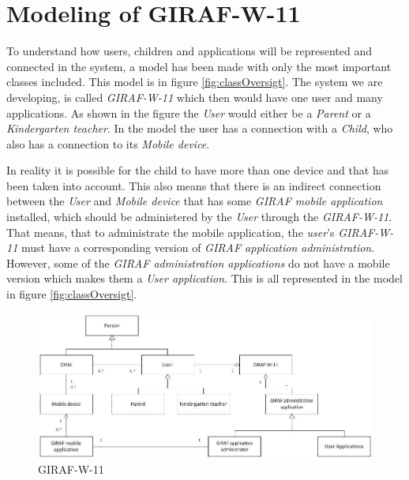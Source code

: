 \section{Modeling of GIRAF-W-11}
To understand how users, children and applications will be represented and connected in the system, a model has been made with only the most important classes included. This model is in figure \vref{fig:classOversigt}. The system we are developing, is called \emph{GIRAF-W-11} which then would have one user and many applications. As shown in the figure the \emph{User} would either be a \emph{Parent} or a \emph{Kindergarten teacher}. In the model the user has a connection with a \emph{Child}, who also has a connection to its \emph{Mobile device}.

In reality it is possible for the child to have more than one device and that has been taken into account. This also means that there is an indirect connection between the \emph{User} and \emph{Mobile device} that has some \emph{GIRAF mobile application} installed, which should be administered by the \emph{User} through the \emph{GIRAF-W-11}. That means, that to administrate the mobile application, the \emph{user}'s \emph{GIRAF-W-11} must have a corresponding version of \emph{GIRAF application administration}. However, some of the \emph{GIRAF administration applications} do not have a mobile version which makes them a \emph{User application}. This is all represented in the model in figure \vref{fig:classOversigt}.


\begin{figure}[!ht]
	\centering
		\includegraphics[width=1.00\textwidth]{img/classOversigt.jpg}
	\caption{GIRAF-W-11}
	\label{fig:classOversigt}
\end{figure}
\newpage